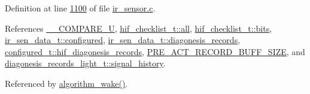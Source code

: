 Definition at line \hyperlink{a00045_source_l01100}{1100} of file \hyperlink{a00045_source}{ir\+\_\+sensor.\+c}.



References \hyperlink{a00021_source_l00025}{\+\_\+\+\_\+\+C\+O\+M\+P\+A\+R\+E\+\_\+\+U}, \hyperlink{a00021_source_l00210}{hif\+\_\+checklist\+\_\+t\+::all}, \hyperlink{a00021_a4c757443cba2deaf7051fd53f385a73e}{hif\+\_\+checklist\+\_\+t\+::bits}, \hyperlink{a00023_source_l00040}{ir\+\_\+sen\+\_\+data\+\_\+t\+::configured}, \hyperlink{a00023_source_l00053}{ir\+\_\+sen\+\_\+data\+\_\+t\+::diagonesis\+\_\+records}, \hyperlink{a00021_source_l00206}{configured\+\_\+t\+::hif\+\_\+diagonesis\+\_\+records}, \hyperlink{a00022_source_l00013}{P\+R\+E\+\_\+\+A\+C\+T\+\_\+\+R\+E\+C\+O\+R\+D\+\_\+\+B\+U\+F\+F\+\_\+\+S\+I\+Z\+E}, and \hyperlink{a00017_affb63906d23cb1cb7787d61eaaedfb60}{diagonesis\+\_\+records\+\_\+light\+\_\+t\+::signal\+\_\+history}.



Referenced by \hyperlink{a00038_source_l00670}{algorithm\+\_\+wake()}.


